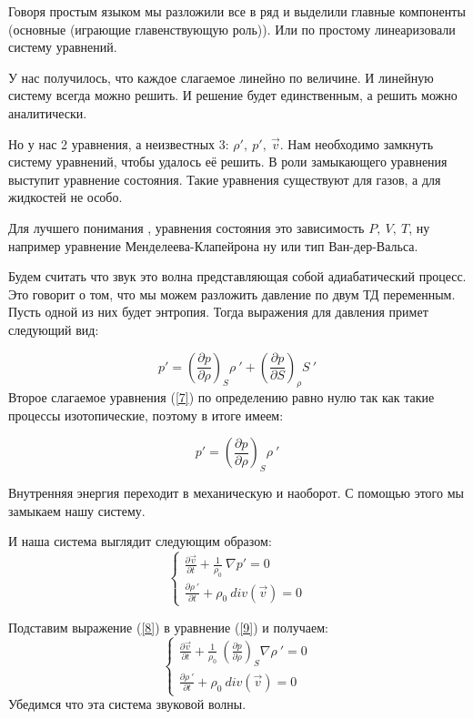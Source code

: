 \documentclass[14pt,a4paper,oneside]{extarticle}	%
\begin{document}
Говоря простым языком мы разложили все в ряд и выделили главные компоненты (основные (играющие главенствующую роль)). Или по простому линеаризовали систему уравнений.

У нас получилось, что каждое слагаемое линейно по величине. И линейную систему всегда можно решить. И решение будет единственным, а решить можно аналитически.

Но у нас 2 уравнения, а неизвестных 3: $ \rho' , \: p', \: \vec{v} $. Нам необходимо замкнуть систему уравнений, чтобы удалось её решить. 
В роли замыкающего уравнения выступит уравнение состояния.
Такие уравнения существуют для газов, а для жидкостей не особо. 

Для лучшего понимания , уравнения состояния это зависимость $ P,\:V,\:T $, ну например уравнение Менделеева-Клапейрона ну или тип Ван-дер-Вальса.

Будем считать что звук это волна представляющая собой адиабатический процесс.
Это говорит о том, что мы можем разложить давление по двум ТД переменным. Пусть одной из них будет энтропия.
Тогда выражения для давления примет следующий вид:

\begin{equation}\label{7}
p' = \left( \frac{\partial p}{\partial \rho} \right)_{S}  \rho\:' + \left( \frac{\partial p}{\partial S} \right)_{\rho}  S\:'
\end{equation}
Второе слагаемое уравнения (\ref{7}) по определению равно нулю так как такие процессы изотопические, поэтому в итоге имеем:

\begin{equation}\label{8}
p' = \left( \frac{\partial p}{\partial \rho} \right)_{S}  \rho\:'
\end{equation}

Внутренняя энергия переходит в механическую и наоборот.
С помощью этого мы замыкаем нашу систему.

И наша система выглядит следующим образом:
 \begin{equation}\label{9}
  \begin{cases}
  \frac{\partial \vec{v}}{\partial t} + \frac{1}{\rho_{0}}\: \nabla p' = 0 \\
  \frac{\partial \rho\:'}{\partial t} + \rho_{0}\: div(\vec{v}) = 0
 \end{cases}
 \end{equation}

Подставим выражение (\ref{8}) в уравнение (\ref{9}) и получаем:
 \begin{equation}\label{10}
\begin{cases}
\frac{\partial \vec{v}}{\partial t} + \frac{1}{\rho_{0}}\:\left( \frac{\partial p}{\partial \rho} \right)_{S} \nabla \rho\:' = 0 \\
\frac{\partial \rho\:'}{\partial t} + \rho_{0}\: div(\vec{v}) = 0
\end{cases}
\end{equation}
Убедимся что эта система звуковой волны.
\end{document}

